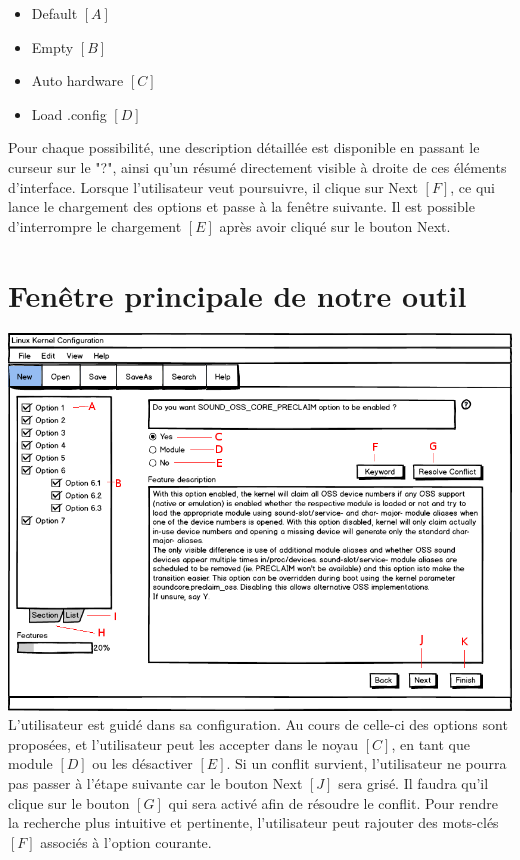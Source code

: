 \documentclass[16pts]{report}
\begin{document}
\begin{itemize}
    \item Default $[A]$
    \item Empty $[B]$
    \item Auto hardware $[C]$
    \item Load .config $[D]$
\end{itemize}

Pour chaque possibilité, une description détaillée est disponible en passant le
curseur sur le "?", ainsi qu'un résumé directement visible à droite de ces
éléments d'interface.
Lorsque l'utilisateur veut poursuivre, il clique sur Next $[F]$, ce qui lance
le chargement des options et passe à la fenêtre suivante. Il est possible
d'interrompre le chargement $[E]$ après avoir cliqué sur le bouton Next.


\section{Fenêtre principale de notre outil}
\label{sec:Fenêtre principale de notre outil}
\includegraphics[scale=0.7]{illustrations/MainWindowList_an.png} \\

L'utilisateur est guidé dans sa configuration. Au cours de celle-ci des options
sont proposées, et l'utilisateur peut les accepter dans le noyau $[C]$, en tant
que module $[D]$ ou les désactiver $[E]$. Si un conflit survient, l'utilisateur
ne pourra pas passer à l'étape suivante car le bouton Next $[J]$ sera grisé. Il
faudra qu'il clique sur le bouton $[G]$ qui sera activé afin de résoudre le
conflit. Pour rendre la recherche plus intuitive et pertinente, l'utilisateur
peut rajouter des mots-clés $[F]$ associés à l'option courante.
\end{document}

